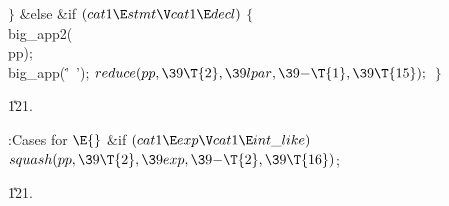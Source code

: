 \4${}\}{}$\2\6
\&{else} \&{if} ${}(\\{cat1}\E\\{stmt}\V\\{cat1}\E\\{decl}){}$\5
${}\{{}$\1\6
\\{big\_app2}(\\{pp});\6
\\{big\_app}(\.{'\ '});\6
${}\\{reduce}(\\{pp},\39\T{2},\39\\{lpar},\39{-}\T{1},\39\T{15});{}$\6
\4${}\}{}$\2\par
\U121.\fi

\B{}:Cases for \X${}\E{}$\6
\&{if} ${}(\\{cat1}\E\\{exp}\V\\{cat1}\E\\{int\_like}){}$\1\5
${}\\{squash}(\\{pp},\39\T{2},\39\\{exp},\39{-}\T{2},\39\T{16}){}$;\2\par
\U121.\fi

